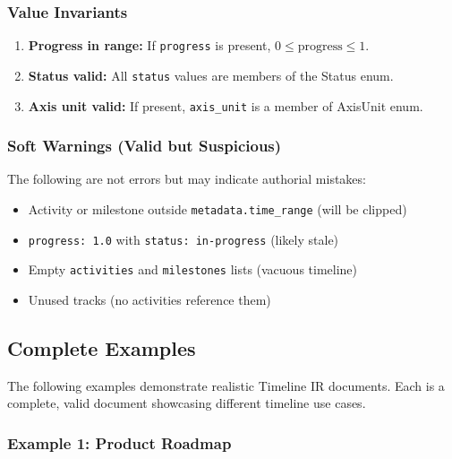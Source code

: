 \subsubsection{Value Invariants}

\begin{enumerate}[resume]
  \item \textbf{Progress in range:} If \texttt{progress} is present, $0 \le \text{progress} \le 1$.
  \item \textbf{Status valid:} All \texttt{status} values are members of the Status enum.
  \item \textbf{Axis unit valid:} If present, \texttt{axis\_unit} is a member of AxisUnit enum.
\end{enumerate}

\subsubsection{Soft Warnings (Valid but Suspicious)}

The following are not errors but may indicate authorial mistakes:

\begin{itemize}
  \item Activity or milestone outside \texttt{metadata.time\_range} (will be clipped)
  \item \texttt{progress: 1.0} with \texttt{status: in-progress} (likely stale)
  \item Empty \texttt{activities} and \texttt{milestones} lists (vacuous timeline)
  \item Unused tracks (no activities reference them)
\end{itemize}


\subsection{Complete Examples}
\label{sec:ir-examples}

The following examples demonstrate realistic Timeline IR documents. Each is a complete,
valid document showcasing different timeline use cases.

\subsubsection{Example 1: Product Roadmap}


